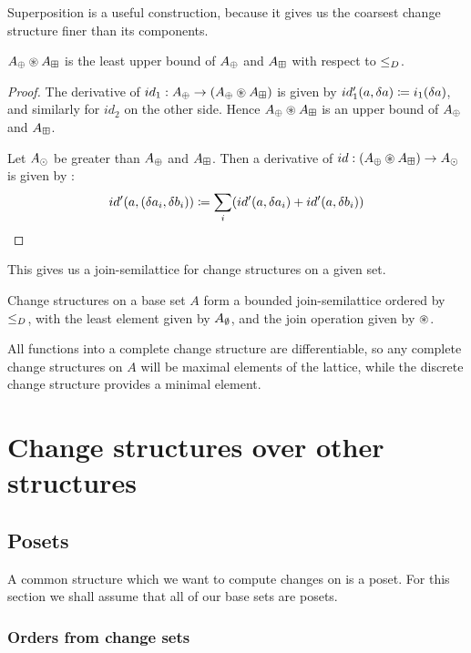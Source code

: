 Superposition is a useful construction, because it gives us the coarsest
change structure finer than its components.

\begin{corollary}
  $A_\oplus \circledast A_\boxplus$ is the least upper bound of $A_\oplus$ and $A_\boxplus$ with respect to $\leq_D$.
\end{corollary}
\begin{proof}
  The derivative of $id_1: A_\oplus \rightarrow (A_\oplus \circledast
  A_\boxplus)$ is given by $id_1'(a, \delta a) \coloneqq 
  i_1(\delta a)$, and similarly for $id_2$ on the other side. Hence $A_\oplus \circledast A_\boxplus$ 
  is an upper bound of $A_\oplus$ and $A_\boxplus$.

  Let $A_\odot$ be greater than $A_\oplus$ and $A_\boxplus$.
  Then a
  derivative of $id: (A_\oplus \circledast A_\boxplus) \rightarrow A_\odot$ is
  given by :
  $$
  id'(a, (\delta a_i, \delta b_i)) \coloneqq 
    \sum_i (id'(a, \delta a_i) + id'(a, \delta b_i))
  $$
\end{proof}

This gives us a join-semilattice for change structures on a given set.

\begin{thm}
  Change structures on a base set $A$ form a bounded join-semilattice 
  ordered by $\leq_D$, with the least element given by
  $A_\emptyset$, and the join operation given by $\circledast$.
\end{thm}

All functions into a complete change structure are differentiable, so any
complete change structures on $A$ will be maximal elements of the lattice, while
the discrete change structure provides a minimal element.

\section{Change structures over other structures}
\label{sec:moreStructures}

\subsection{Posets}
A common structure which we want to compute changes on is a poset. For this
section we shall assume that all of our base sets are posets.

\subsubsection{Orders from change sets}

